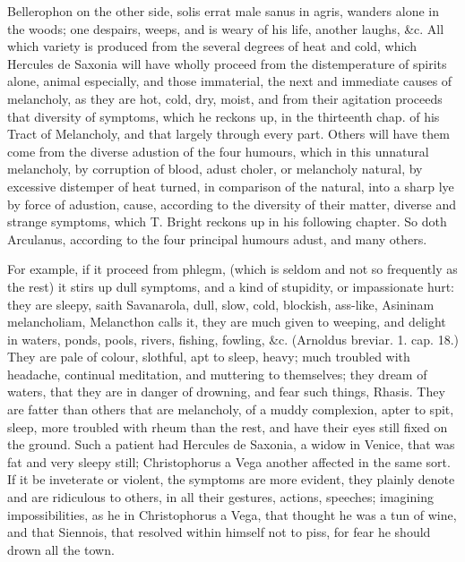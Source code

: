 {Bellerophon on the other side, solis errat male sanus in agris, wanders
alone in the woods; one despairs, weeps, and is weary of his life,
another laughs, \&c. All which variety is produced from the several
degrees of heat and cold, which Hercules de Saxonia will have
wholly proceed from the distemperature of spirits alone, animal
especially, and those immaterial, the next and immediate causes of
melancholy, as they are hot, cold, dry, moist, and from their agitation
proceeds that diversity of symptoms, which he reckons up, in the
thirteenth chap. of his Tract of Melancholy, and that largely
through every part. Others will have them come from the diverse
adustion of the four humours, which in this unnatural melancholy, by
corruption of blood, adust choler, or melancholy natural, by
excessive distemper of heat turned, in comparison of the natural, into
a sharp lye by force of adustion, cause, according to the diversity of
their matter, diverse and strange symptoms, which T. Bright reckons up
in his following chapter. So doth Arculanus, according to the
four principal humours adust, and many others.

For example, if it proceed from phlegm, (which is seldom and not so
frequently as the rest) it stirs up dull symptoms, and a kind of
stupidity, or impassionate hurt: they are sleepy, saith
Savanarola, dull, slow, cold, blockish, ass-like, Asininam
melancholiam,  Melancthon calls it, they are much given to
weeping, and delight in waters, ponds, pools, rivers, fishing, fowling,
\&c. (Arnoldus breviar. 1. cap. 18.) They are pale of colour,
slothful, apt to sleep, heavy; much troubled with headache,
continual meditation, and muttering to themselves; they dream of
waters, that they are in danger of drowning, and fear such
things, Rhasis. They are fatter than others that are melancholy, of a
muddy complexion, apter to spit,  sleep, more troubled with rheum
than the rest, and have their eyes still fixed on the ground. Such a
patient had Hercules de Saxonia, a widow in Venice, that was fat and
very sleepy still; Christophorus a Vega another affected in the same
sort. If it be inveterate or violent, the symptoms are more evident,
they plainly denote and are ridiculous to others, in all their
gestures, actions, speeches; imagining impossibilities, as he in
Christophorus a Vega, that thought he was a tun of wine, and that
Siennois, that resolved within himself not to piss, for fear he should
drown all the town.

}
